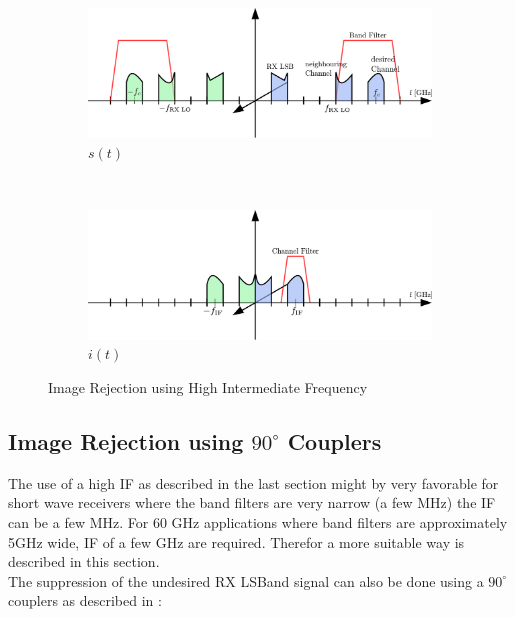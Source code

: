 \begin{figure}[h!]
  \centering
  \begin{subfigure}{0.45\textwidth}
    \centering
    \includegraphics[width=\textwidth]{figures/rx_rf_0_freq_s}
    \caption{$s(t)$}
    \label{fig:rx_rf_0_freq_s}
  \end{subfigure}
  ~
  \begin{subfigure}{0.45\textwidth}
    \centering
    \includegraphics[width=\textwidth]{figures/rx_rf_0_freq_i}
    \caption{$i(t)$}
    \label{fig:rx_rf_0_freq_i}
  \end{subfigure}
  \caption{Image Rejection using High Intermediate Frequency}
  \label{fig:rx_rf_0_freq}
\end{figure}

\subsection{Image Rejection using $90^\circ$ Couplers}
\label{sec:rx_rf_1}
The use of a high \gls{IF} as described in the last section might
by very favorable for short wave receivers where the band filters
are very narrow (a few MHz) the \gls{IF} can be a few MHz.
For 60 GHz applications where band filters are approximately 5GHz wide,
\gls{IF} of a few GHz are required.
Therefor a more suitable way is described in this section. \\

The suppression of the undesired \gls{RX} \gls{LSBand} signal can also be done
using a $90^\circ$ couplers as described in : \\

